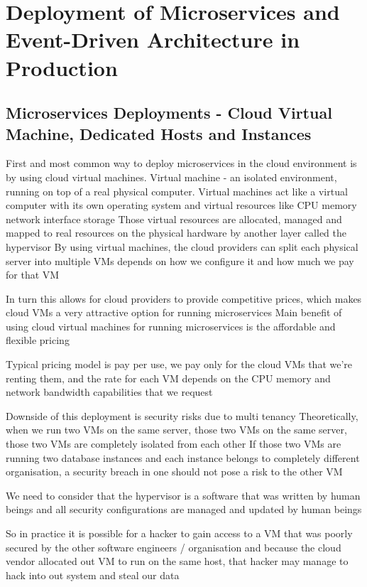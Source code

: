 \documentclass[a4paper, 11pt]{book}
\begin{document}
    \section{Deployment of Microservices and Event-Driven Architecture in Production}

    \subsection{Microservices Deployments - Cloud Virtual Machine, Dedicated Hosts and Instances}
    First and most common way to deploy microservices in the cloud environment is by using cloud virtual machines.
    Virtual machine - an isolated environment, running on top of a real physical computer.
    Virtual machines act like a virtual computer with its own operating system and virtual resources like CPU memory network interface storage
    Those virtual resources are allocated, managed and mapped to real resources on the physical hardware by another layer called the hypervisor
    By using virtual machines, the cloud providers can split each physical server into multiple VMs depends on how we configure it and how much we pay for that VM

    In turn this allows for cloud providers to provide competitive prices, which makes cloud VMs a very attractive option for running microservices
    Main benefit of using cloud virtual machines for running microservices is the affordable and flexible pricing

    Typical pricing model is pay per use, we pay only for the cloud VMs that we're renting them, and the rate for each VM depends on the CPU memory and network bandwidth capabilities that we request

    Downside of this deployment is security risks due to multi tenancy
    Theoretically, when we run two VMs on the same server, those two VMs on the same server, those two VMs are completely isolated from each other
    If those two VMs are running two database instances and each instance belongs to completely different organisation, a security breach in one should not pose a risk to the other VM

    We need to consider that the hypervisor is a software that was written by human beings and all security configurations are managed and updated by human beings

    So in practice it is possible for a hacker to gain access to a VM that was poorly secured by the other software engineers / organisation and because the cloud vendor allocated out VM to run on the same host, that hacker may manage to hack into out system and steal our data
\end{document}
